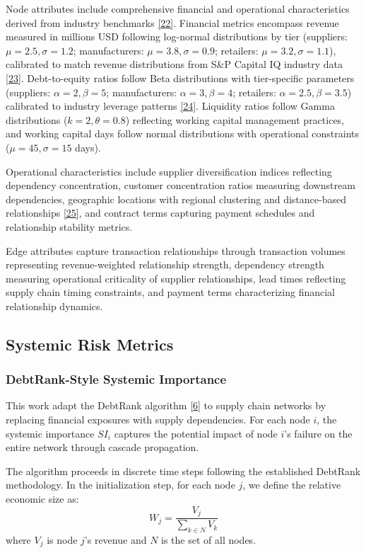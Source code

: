 \documentclass[a4 paper, 11pt,twoside]{article}
\newcommand{\0}{\Bf{0}}
\theoremstyle{definition}
\begin{document}
Node attributes include comprehensive financial and operational characteristics derived from industry benchmarks \hyperref[ref22]{[22]}. Financial metrics encompass revenue measured in millions USD following log-normal distributions by tier (suppliers: $\mu = 2.5, \sigma = 1.2$; manufacturers: $\mu = 3.8, \sigma = 0.9$; retailers: $\mu = 3.2, \sigma = 1.1$), calibrated to match revenue distributions from S\&P Capital IQ industry data \hyperref[ref23]{[23]}. Debt-to-equity ratios follow Beta distributions with tier-specific parameters (suppliers: $\alpha = 2, \beta = 5$; manufacturers: $\alpha = 3, \beta = 4$; retailers: $\alpha = 2.5, \beta = 3.5$) calibrated to industry leverage patterns \hyperref[ref24]{[24]}. Liquidity ratios follow Gamma distributions ($k = 2, \theta = 0.8$) reflecting working capital management practices, and working capital days follow normal distributions with operational constraints ($\mu = 45, \sigma = 15$ days).

Operational characteristics include supplier diversification indices reflecting dependency concentration, customer concentration ratios measuring downstream dependencies, geographic locations with regional clustering and distance-based relationships \hyperref[ref25]{[25]}, and contract terms capturing payment schedules and relationship stability metrics.

Edge attributes capture transaction relationships through transaction volumes representing revenue-weighted relationship strength, dependency strength measuring operational criticality of supplier relationships, lead times reflecting supply chain timing constraints, and payment terms characterizing financial relationship dynamics.

\subsection{Systemic Risk Metrics}

\subsubsection{DebtRank-Style Systemic Importance}

This work adapt the DebtRank algorithm \hyperref[ref6]{[6]} to supply chain networks by replacing financial exposures with supply dependencies. For each node $i$, the systemic importance $SI_i$ captures the potential impact of node $i$'s failure on the entire network through cascade propagation.

The algorithm proceeds in discrete time steps following the established DebtRank methodology. In the initialization step, for each node $j$, we define the relative economic size as:
\begin{equation}
W_j = \frac{V_j}{\sum_{k \in N} V_k}
\end{equation}
where $V_j$ is node $j$'s revenue and $N$ is the set of all nodes.
\end{document}
